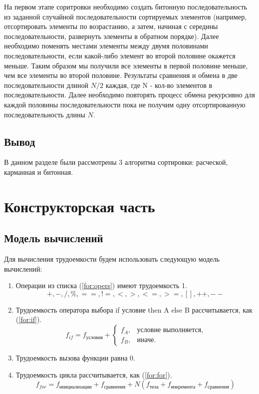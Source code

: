 \documentclass[12pt]{report}
\begin{document}
	На первом этапе соритровки необходимо создать битонную последовательность из заданной случайной последовательности сортируемых элементов (например, отсортировать элементы по возрастанию, а затем, начиная с середины последовательности, развернуть элементы в обратном порядке). Далее необходимо поменять местами элементы между двумя половинами последовательности, если какой-либо элемент во второй половине окажется меньше. Таким образом мы получили все элементы в первой половине меньше, чем все элементы во второй половине. Результаты сравнения и обмена в две последовательности длиной $N/2$ каждая, где N - кол-во элементов в последовательности. Далее необходимо повторять процесс обмена рекурсивно для каждой половины последовательности пока не получим одну отсортированную последовательность длины $N$.
	
	\section{Вывод}
	
	В данном разделе были рассмотрены 3 алгоритма сортировки: расческой, карманная и битонная.
	
	\clearpage
	
	\chapter{Конструкторская часть}
	
	\section{Модель вычислений}

	Для вычисления трудоемкости будем использовать следующую модель вычислений:

	\begin{enumerate}
		\item Операции из списка (\ref{for:opers}) имеют трудоемкость 1.
		\begin{equation}
		\label{for:opers}
		+, -, /, \%, ==, !=, <, >, <=, >=, [], ++, {-}-
		\end{equation}
		\item Трудоемкость оператора выбора if условие then A else B рассчитывается, как (\ref{for:if}).
		\begin{equation}
		\label{for:if}
		f_{if} = f_{\text{условия}} +
		\begin{cases}
		f_A, & \text{условие выполняется,}\\
		f_B, & \text{иначе.}
		\end{cases}
		\end{equation}
		\item Трудоемкость вызова функции равна 0.
		\item Трудоемкость цикла рассчитывается, как (\ref{for:for}).
		\begin{equation}
		\label{for:for}
		f_{for} = f_{\text{инициализации}} + f_{\text{сравнения}} + N(f_{\text{тела}} + f_{\text{инкремента}} + f_{\text{сравнения}})
		\end{equation}
	\end{enumerate}
	
\end{document}

